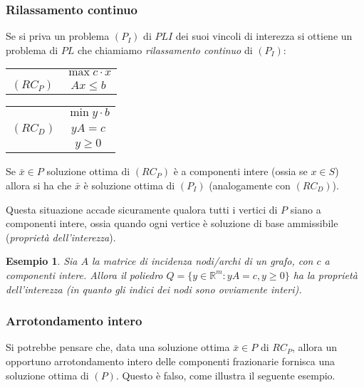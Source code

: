 \documentclass[a4paper,11pt]{book}
\newcommand{\reals}{\mathbb{R}}
\theoremstyle{break}
\newtheorem{es}[deff]{Esempio}
\begin{document}
\subsubsection*{Rilassamento continuo}

Se si priva un problema $(P_I)$ di $PLI$ dei suoi vincoli di interezza si ottiene un problema di $PL$ che chiamiamo \emph{rilassamento continuo} di $(P_I)$:



\begin{multicols}{2}
 \begin{center}
 \begin{tabular}{c c}
    &$\max c\cdot x$\\
    
   $(RC_P)$ &$Ax \leq b$\\
    
 \end{tabular}

     \end{center}

 \begin{center}
   \begin{tabular}{c c}
    &$\min y\cdot b$\\
    
   $(RC_D)$ &$yA = c$\\
    
    &$y \geq 0$

 \end{tabular}
 \end{center}

 
\end{multicols}

Se $\bar x \in P$ soluzione ottima di $(RC_P)$ è a componenti intere (ossia se $x \in S$) allora si ha che $\bar x$ è soluzione ottima di $(P_I)$ (analogamente con $(RC_D)$).\smallskip

Questa situazione accade sicuramente qualora tutti i vertici di $P$ siano a componenti intere, ossia quando ogni vertice è soluzione di base ammissibile (\emph{proprietà dell'interezza}).

\begin{es}\footnotesize
 Sia $A$ la matrice di incidenza nodi/archi di un grafo, con $c$ a componenti intere. Allora il poliedro $Q = \{y \in \reals^m : yA = c, y \geq 0\}$ ha la proprietà dell'interezza (in quanto gli indici dei nodi sono ovviamente interi).
\end{es}

\subsubsection*{Arrotondamento intero}
Si potrebbe pensare che, data una soluzione ottima $\bar x \in P$ di $RC_P$, allora un opportuno arrotondamento intero delle componenti frazionarie fornisca una soluzione ottima di $(P)$. Questo è falso, come illustra il seguente esempio.
\end{document}

